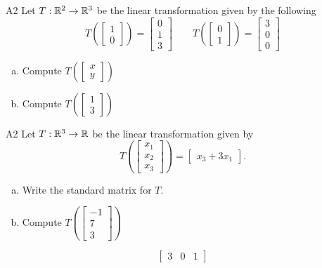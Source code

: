 \begin{problem}{A2}
Let $T: \mathbb{R}^2 \rightarrow \mathbb{R}^3$ be the linear transformation given by the following
\[
  T\left(\begin{bmatrix}1\\0\end{bmatrix}\right)
    =
  \begin{bmatrix} 0 \\ 1 \\ 3 \end{bmatrix}
\hspace{2em}
  T\left(\begin{bmatrix}0\\1\end{bmatrix}\right)
    =
  \begin{bmatrix} 3 \\ 0 \\ 0 \end{bmatrix}
\]
\begin{enumerate}[(a)]
\item Compute \( T\left( \begin{bmatrix}x\\ y \end{bmatrix} \right) \)
\item Compute \( T\left( \begin{bmatrix} 1\\ 3\end{bmatrix} \right) \)
\end{enumerate}
\end{problem}

\begin{problem}{A2}
Let $T: \mathbb{R}^3 \rightarrow \mathbb{R}$ be the linear transformation given by $$T\left(\begin{bmatrix} x_1 \\ x_2 \\ x_3  \end{bmatrix} \right) = \begin{bmatrix} x_3+3x_1 \end{bmatrix}.$$
\begin{enumerate}[(a)]
\item Write the standard matrix for $T$.
\item Compute \( T\left( \begin{bmatrix} -1 \\ 7 \\ 3\end{bmatrix} \right) \)
\end{enumerate}
\end{problem}
\begin{solution}
$$\begin{bmatrix} 3 & 0 & 1 \end{bmatrix}$$
\end{solution}

